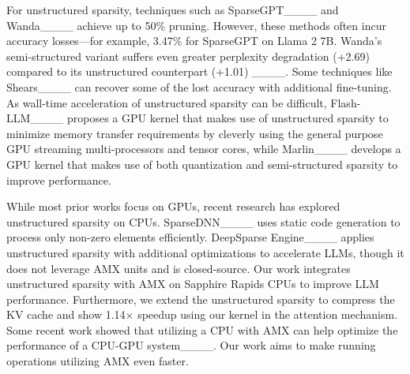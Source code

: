 For unstructured sparsity, techniques such as SparseGPT____ and Wanda____ achieve up to 50\% pruning. However, these methods often incur accuracy losses—for example, 3.47\% for SparseGPT on Llama 2 7B. Wanda’s semi-structured variant suffers even greater perplexity degradation (+2.69) compared to its unstructured counterpart (+1.01) ____. Some techniques like Shears____ can recover some of the lost accuracy with additional fine-tuning.
As wall-time acceleration of unstructured sparsity can be difficult, Flash-LLM____ proposes a GPU kernel that makes use of unstructured sparsity to minimize memory transfer requirements by cleverly using the general purpose GPU streaming multi-processors and tensor cores, while Marlin____ develops a GPU kernel that makes use of both quantization and semi-structured sparsity to improve performance.


While most prior works focus on GPUs, recent research has explored unstructured sparsity on CPUs. SparseDNN____ uses static code generation to process only non-zero elements efficiently. DeepSparse Engine____ applies unstructured sparsity with additional optimizations to accelerate LLMs, though it does not leverage AMX units and is closed-source. Our work integrates unstructured sparsity with AMX on Sapphire Rapids CPUs to improve LLM performance. Furthermore, we extend the unstructured sparsity to compress the KV cache and show 1.14$\times$ speedup using our kernel in the attention mechanism.
Some recent work showed that utilizing a CPU with AMX can help optimize the performance of a CPU-GPU system____. Our work aims to make running operations utilizing AMX even faster.